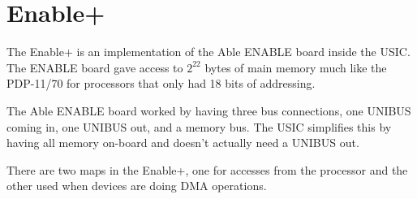 %

\chapter{Enable+}

The Enable+ is an implementation of the Able ENABLE board inside the
USIC.  The ENABLE board gave access to $2^{22}$ bytes of main memory
much like the PDP-11/70 for processors that only had 18 bits of
addressing.

The Able ENABLE board worked by having three bus connections, one
UNIBUS coming in, one UNIBUS out, and a memory bus.  The USIC
simplifies this by having all memory on-board and doesn't actually
need a UNIBUS out.

There are two maps in the Enable+, one for accesses from the processor
and the other used when devices are doing DMA operations.
